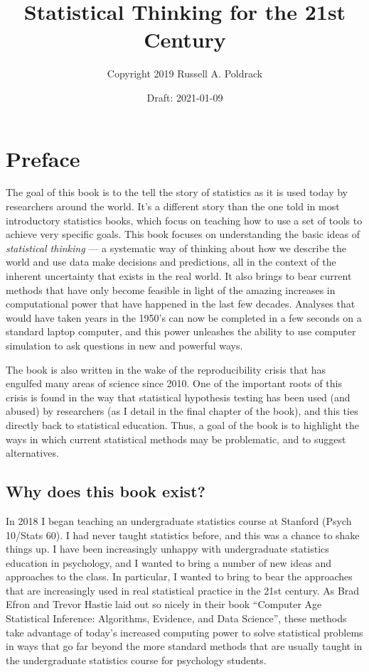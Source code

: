 \documentclass[12pt,]{book}
\title{Statistical Thinking for the 21st Century}
\author{Copyright 2019 Russell A. Poldrack}
\date{Draft: 2021-01-09}
\theoremstyle{definition}
\theoremstyle{definition}
\theoremstyle{definition}
\theoremstyle{remark}
\begin{document}
\maketitle

{
\setcounter{tocdepth}{1}
\tableofcontents
}
\hypertarget{preface}{%
\chapter*{Preface}\label{preface}}

The goal of this book is to the tell the story of statistics as it is used today by researchers around the world. It's a different story than the one told in most introductory statistics books, which focus on teaching how to use a set of tools to achieve very specific goals. This book focuses on understanding the basic ideas of \emph{statistical thinking} --- a systematic way of thinking about how we describe the world and use data make decisions and predictions, all in the context of the inherent uncertainty that exists in the real world. It also brings to bear current methods that have only become feasible in light of the amazing increases in computational power that have happened in the last few decades. Analyses that would have taken years in the 1950's can now be completed in a few seconds on a standard laptop computer, and this power unleashes the ability to use computer simulation to ask questions in new and powerful ways.

The book is also written in the wake of the reproducibility crisis that has engulfed many areas of science since 2010. One of the important roots of this crisis is found in the way that statistical hypothesis testing has been used (and abused) by researchers (as I detail in the final chapter of the book), and this ties directly back to statistical education. Thus, a goal of the book is to highlight the ways in which current statistical methods may be problematic, and to suggest alternatives.

\hypertarget{why-does-this-book-exist}{%
\section{Why does this book exist?}\label{why-does-this-book-exist}}

In 2018 I began teaching an undergraduate statistics course at Stanford (Psych 10/Stats 60). I had never taught statistics before, and this was a chance to shake things up. I have been increasingly unhappy with undergraduate statistics education in psychology, and I wanted to bring a number of new ideas and approaches to the class. In particular, I wanted to bring to bear the approaches that are increasingly used in real statistical practice in the 21st century. As Brad Efron and Trevor Hastie laid out so nicely in their book ``Computer Age Statistical Inference: Algorithms, Evidence, and Data Science'', these methods take advantage of today's increased computing power to solve statistical problems in ways that go far beyond the more standard methods that are usually taught in the undergraduate statistics course for psychology students.
\end{document}
